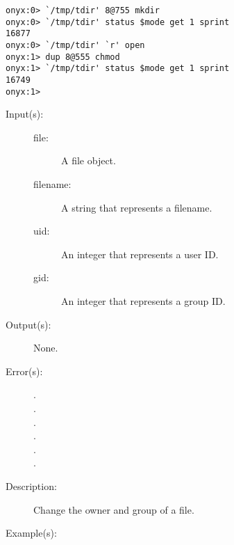 \begin{description}
\begin{description}
\begin{verbatim}
onyx:0> `/tmp/tdir' 8@755 mkdir
onyx:0> `/tmp/tdir' status $mode get 1 sprint
16877
onyx:0> `/tmp/tdir' `r' open
onyx:1> dup 8@555 chmod
onyx:1> `/tmp/tdir' status $mode get 1 sprint
16749
onyx:1>
		\end{verbatim}
	\end{description}
\label{systemdict:chown}
\item[{\onyxop{file/filename uid gid}{chown}{--}}: ]
	\begin{description}\item[]
	\item[Input(s): ]
		\begin{description}\item[]
		\item[file: ]
			A file object.
		\item[filename: ]
			A string that represents a filename.
		\item[uid: ]
			An integer that represents a user ID.
		\item[gid: ]
			An integer that represents a group ID.
		\end{description}
	\item[Output(s): ] None.
	\item[Error(s): ]
		\begin{description}\item[]
		\item[.]
		\item[.]
		\item[.]
		\item[.]
		\item[.]
		\item[.]
		\end{description}
	\item[Description: ]
		Change the owner and group of a file.
	\item[Example(s): ]\begin{verbatim}


\end{verbatim}
\end{description}
\end{description}
